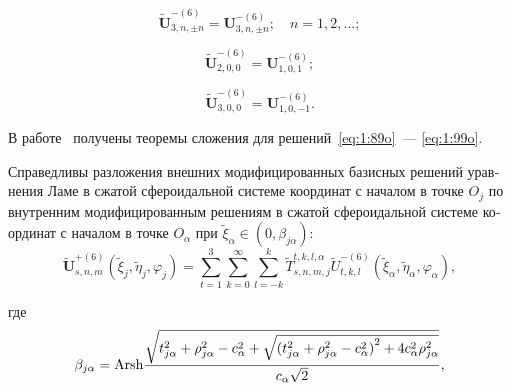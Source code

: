 \begin{russian}
\begin{equation}\label{eq:1:97o}
\mathbf{\tilde U}_{3,n,\pm n}^{-(6)}=\mathbf{U}_{3,n,\pm n}^{-(6)};\quad n=1,2,\dots;
\end{equation}

\begin{equation}\label{eq:1:98o}
\mathbf{\tilde U}_{2,0,0}^{-(6)}=\mathbf{U}_{1,0,1}^{-(6)};
\end{equation}

\begin{equation}\label{eq:1:99o}
\mathbf{\tilde U}_{3,0,0}^{-(6)}=\mathbf{U}_{1,0,-1}^{-(6)}.
\end{equation}

В работе~\cite{Nikolaev2014-1} получены теоремы сложения для решений~\eqref{eq:1:89o}~--- \eqref{eq:1:99o}.

\begin{theorem}
Справедливы разложения внешних модифицированных базисных решений уравнения Ламе в сжатой сфероидальной системе координат с началом в точке $O_j$ по внутренним модифицированным решениям в сжатой сфероидальной системе координат с началом в точке $O_\alpha$ при $\tilde\xi_\alpha\in(0,\beta_{j\alpha})$:
\begin{equation}
\mathbf{\tilde U}_{s,n,m}^{+(6)}(\tilde\xi_j,\tilde\eta_j,\varphi_j)=\sum\limits_{t=1}^3\sum\limits_{k=0}^\infty\sum\limits_{l=-k}^k\tilde T_{s,n,m,j}^{t,k,l,\alpha}\tilde U_{t,k,l}^{-(6)}(\tilde\xi_\alpha,\tilde\eta_\alpha,\varphi_\alpha),
\label{eq:1:100o}
\end{equation}

\noindent где
\begin{equation*}
\beta_{j\alpha}={\rm{Arsh}}\frac{{\sqrt {t_{j\alpha }^2 + \rho _{j\alpha }^2 - c_\alpha ^2 + \sqrt {{{(t_{j\alpha }^2 + \rho _{j\alpha }^2 - c_\alpha ^2)}^2} + 4c_\alpha ^2\rho _{j\alpha }^2} } }}{{{c_\alpha }\sqrt 2 }},
\end{equation*}


\end{theorem}
\end{russian}
